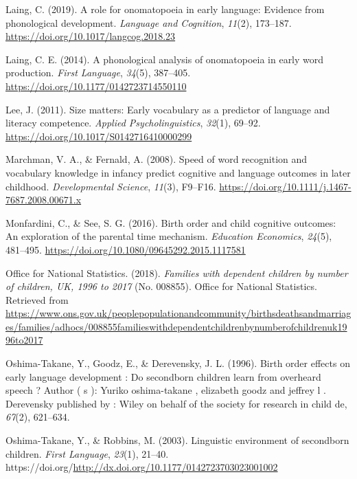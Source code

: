 \documentclass[
  english,
  man,floatsintext]{apa6}
\newlength{\cslhangindent}
\newlength{\cslentryspacingunit} %
\newenvironment{CSLReferences}[2] %
 {%
  \setlength{\parindent}{0pt}
  \ifodd #1
  \let\oldpar\par
  \def\par{\hangindent=\cslhangindent\oldpar}
  \fi
  \setlength{\parskip}{#2\cslentryspacingunit}
 }%
 {}
\begin{document}
\begin{CSLReferences}{1}{0}
\leavevmode{}%
Laing, C. (2019). A role for onomatopoeia in early language: Evidence from phonological development. \emph{Language and Cognition}, \emph{11}(2), 173--187. \url{https://doi.org/10.1017/langcog.2018.23}

\leavevmode{}%
Laing, C. E. (2014). A phonological analysis of onomatopoeia in early word production. \emph{First Language}, \emph{34}(5), 387--405. \url{https://doi.org/10.1177/0142723714550110}

\leavevmode{}%
Lee, J. (2011). Size matters: Early vocabulary as a predictor of language and literacy competence. \emph{Applied Psycholinguistics}, \emph{32}(1), 69--92. \url{https://doi.org/10.1017/S0142716410000299}

\leavevmode{}%
Marchman, V. A., \& Fernald, A. (2008). Speed of word recognition and vocabulary knowledge in infancy predict cognitive and language outcomes in later childhood. \emph{Developmental Science}, \emph{11}(3), F9--F16. \url{https://doi.org/10.1111/j.1467-7687.2008.00671.x}

\leavevmode{}%
Monfardini, C., \& See, S. G. (2016). Birth order and child cognitive outcomes: An exploration of the parental time mechanism. \emph{Education Economics}, \emph{24}(5), 481--495. \url{https://doi.org/10.1080/09645292.2015.1117581}

\leavevmode{}%
Office for National Statistics. (2018). \emph{Families with dependent children by number of children, {UK}, 1996 to 2017} (No. 008855). Office for National Statistics. Retrieved from \url{https://www.ons.gov.uk/peoplepopulationandcommunity/birthsdeathsandmarriages/families/adhocs/008855familieswithdependentchildrenbynumberofchildrenuk1996to2017}

\leavevmode{}%
Oshima-Takane, Y., Goodz, E., \& Derevensky, J. L. (1996). Birth order effects on early language development : Do secondborn children learn from overheard speech ? Author ( s ): Yuriko oshima-takane , elizabeth goodz and jeffrey l . Derevensky published by : Wiley on behalf of the society for research in child de, \emph{67}(2), 621--634.

\leavevmode{}%
Oshima-Takane, Y., \& Robbins, M. (2003). Linguistic environment of secondborn children. \emph{First Language}, \emph{23}(1), 21--40. https://doi.org/\url{http://dx.doi.org/10.1177/0142723703023001002}


\end{CSLReferences}
\end{document}
